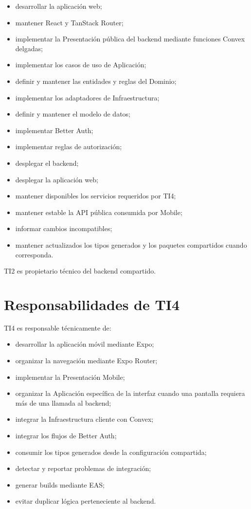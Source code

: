 \documentclass[11pt,a4paper]{article}
\begin{document}
\begin{itemize}
  \item desarrollar la aplicación web;
  \item mantener React y TanStack Router;
  \item implementar la Presentación pública del backend mediante funciones
    Convex delgadas;
  \item implementar los casos de uso de Aplicación;
  \item definir y mantener las entidades y reglas del Dominio;
  \item implementar los adaptadores de Infraestructura;
  \item definir y mantener el modelo de datos;
  \item implementar Better Auth;
  \item implementar reglas de autorización;
  \item desplegar el backend;
  \item desplegar la aplicación web;
  \item mantener disponibles los servicios requeridos por TI4;
  \item mantener estable la API pública consumida por Mobile;
  \item informar cambios incompatibles;
  \item mantener actualizados los tipos generados y los paquetes compartidos
    cuando corresponda.
\end{itemize}

TI2 es propietario técnico del backend compartido.

\section{Responsabilidades de TI4}

TI4 es responsable técnicamente de:

\begin{itemize}
  \item desarrollar la aplicación móvil mediante Expo;
  \item organizar la navegación mediante Expo Router;
  \item implementar la Presentación Mobile;
  \item organizar la Aplicación específica de la interfaz cuando una pantalla
    requiera más de una llamada al backend;
  \item integrar la Infraestructura cliente con Convex;
  \item integrar los flujos de Better Auth;
  \item consumir los tipos generados desde la configuración compartida;
  \item detectar y reportar problemas de integración;
  \item generar builds mediante EAS;
  \item evitar duplicar lógica perteneciente al backend.
\end{itemize}
\end{document}

